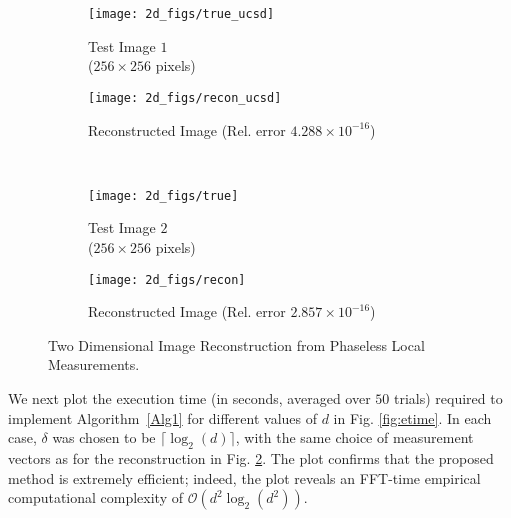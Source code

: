 \begin{figure}[p]
    \centering
    \begin{subfigure}[b]{0.495\textwidth}
        \centering
        \texttt{[image: 2d\_figs/true\_ucsd]}
        \caption{Test Image $1$ \\ ($256\times 256$ pixels)}
        \label{fig:true}
    \end{subfigure}
    \hfill
    \begin{subfigure}[b]{0.495\textwidth}
        \centering
        \texttt{[image: 2d\_figs/recon\_ucsd]}
        \caption{Reconstructed Image (Rel. error $4.288\times 10^{-16}$)}
        \label{fig:recon}
    \end{subfigure}
    \vspace{0.05in} \\
    \begin{subfigure}[b]{0.495\textwidth}
        \centering
        \texttt{[image: 2d\_figs/true]}
        \caption{Test Image $2$ \\ ($256\times 256$ pixels)}
        \label{fig:true_msu}
    \end{subfigure}
    \hfill
    \begin{subfigure}[b]{0.495\textwidth}
        \centering
        \texttt{[image: 2d\_figs/recon]}
        \caption{Reconstructed Image (Rel. error $2.857\times 10^{-16}$)}
        \label{fig:recon_msu}
    \end{subfigure}
    \vspace{0.05in}
    \caption{Two Dimensional Image Reconstruction from Phaseless Local Measurements.}
    \label{fig:2d-recon}
\end{figure}
%


We next plot the execution time (in seconds, averaged over $50$ trials) required to implement Algorithm~\ref{Alg1} for different values of $d$ in Fig. \ref{fig:etime}. In each case, $\delta$ was chosen to be $\lceil \log_2(d) \rceil$, with the same choice of measurement vectors as for the reconstruction in Fig.  \ref{fig:recon}. The plot confirms that the proposed method is extremely efficient; indeed, the plot reveals an FFT-time empirical computational complexity of $\mathcal O(d^2 \log_2(d^2))$.

